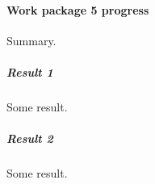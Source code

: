 
\paragraph{Work package 5 progress}

Summary.

\subparagraph{Result 1}

Some result.

\subparagraph{Result 2}

Some result.